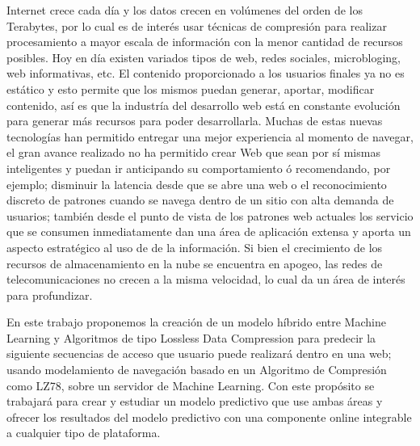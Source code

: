 
Internet crece cada día y los datos crecen en volúmenes del orden de los Terabytes, por lo cual es de interés usar técnicas de compresión para realizar procesamiento a mayor escala de información con la menor cantidad de recursos posibles. Hoy en día existen variados tipos de web, redes sociales, microbloging, web informativas, etc. El contenido proporcionado a los usuarios finales ya no es estático y esto permite que los mismos puedan generar, aportar, modificar contenido, así es que la industría del desarrollo web está en constante evolución para generar más recursos para poder desarrollarla. Muchas de estas nuevas tecnologías han permitido entregar una mejor experiencia al momento de navegar, el gran avance realizado no ha permitido crear Web que sean por sí mismas inteligentes y puedan ir anticipando su comportamiento ó recomendando, por ejemplo; disminuir la latencia desde que se abre una web o el reconocimiento discreto de patrones cuando se navega dentro de un sitio con alta demanda de usuarios; también desde el punto de vista de los patrones web actuales los servicio que se consumen inmediatamente dan una área de aplicación extensa y aporta un aspecto estratégico al uso de de la información. Si bien el crecimiento de los recursos de almacenamiento en la nube se encuentra en apogeo, las redes de telecomunicaciones  no crecen a la misma velocidad, lo cual da un área de interés para profundizar. 

En este trabajo proponemos  la creación de un modelo híbrido entre Machine Learning y Algoritmos de tipo Lossless Data Compression para predecir la siguiente secuencias de acceso que usuario puede realizará dentro en una web; usando modelamiento de navegación basado en un Algoritmo de Compresión como LZ78, sobre un servidor de Machine Learning. Con este propósito se trabajará para crear y estudiar un modelo predictivo que use ambas áreas y  ofrecer los resultados del modelo predictivo con una componente online integrable a cualquier tipo de plataforma.